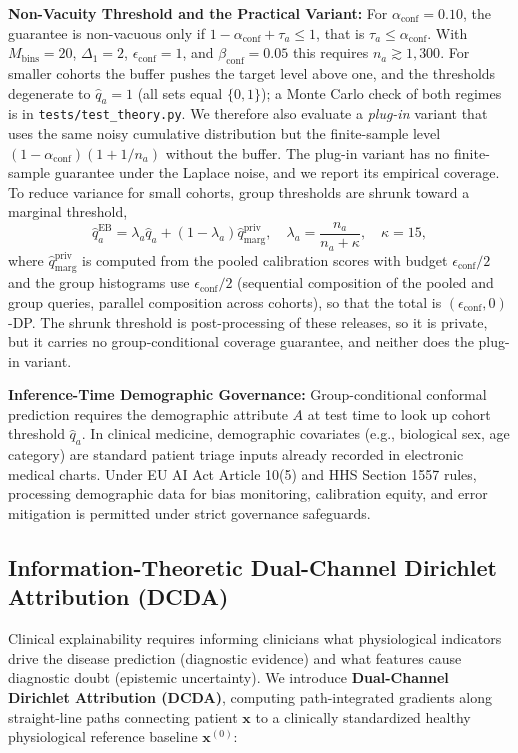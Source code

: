 \documentclass[3p,12pt]{elsarticle}
\theoremstyle{plain}
\theoremstyle{definition}
\begin{document}
\noindent \textbf{Non-Vacuity Threshold and the Practical Variant:} For $\alpha_{\text{conf}} = 0.10$, the guarantee is non-vacuous only if $1 - \alpha_{\text{conf}} + \tau_a \le 1$, that is $\tau_a \le \alpha_{\text{conf}}$. With $M_{\text{bins}} = 20$, $\Delta_1 = 2$, $\epsilon_{\text{conf}} = 1$, and $\beta_{\text{conf}} = 0.05$ this requires $n_a \gtrsim 1{,}300$. For smaller cohorts the buffer pushes the target level above one, and the thresholds degenerate to $\hat{q}_a = 1$ (all sets equal $\{0,1\}$); a Monte Carlo check of both regimes is in \texttt{tests/test\_theory.py}. We therefore also evaluate a \emph{plug-in} variant that uses the same noisy cumulative distribution but the finite-sample level $(1-\alpha_{\text{conf}})(1 + 1/n_a)$ without the buffer. The plug-in variant has no finite-sample guarantee under the Laplace noise, and we report its empirical coverage. To reduce variance for small cohorts, group thresholds are shrunk toward a marginal threshold,
\begin{equation}
    \hat{q}_a^{\text{EB}} = \lambda_a \hat{q}_a + (1 - \lambda_a) \hat{q}_{\text{marg}}^{\text{priv}}, \quad \lambda_a = \frac{n_a}{n_a + \kappa}, \quad \kappa = 15,
\end{equation}
where $\hat{q}_{\text{marg}}^{\text{priv}}$ is computed from the pooled calibration scores with budget $\epsilon_{\text{conf}}/2$ and the group histograms use $\epsilon_{\text{conf}}/2$ (sequential composition of the pooled and group queries, parallel composition across cohorts), so that the total is $(\epsilon_{\text{conf}}, 0)$-DP. The shrunk threshold is post-processing of these releases, so it is private, but it carries no group-conditional coverage guarantee, and neither does the plug-in variant.

\noindent \textbf{Inference-Time Demographic Governance:} Group-conditional conformal prediction requires the demographic attribute $A$ at test time to look up cohort threshold $\hat{q}_a$. In clinical medicine, demographic covariates (e.g., biological sex, age category) are standard patient triage inputs already recorded in electronic medical charts. Under EU AI Act Article 10(5) and HHS Section 1557 rules, processing demographic data for bias monitoring, calibration equity, and error mitigation is permitted under strict governance safeguards.

\subsection{Information-Theoretic Dual-Channel Dirichlet Attribution (DCDA)}
Clinical explainability requires informing clinicians what physiological indicators drive the disease prediction (diagnostic evidence) and what features cause diagnostic doubt (epistemic uncertainty). We introduce \textbf{Dual-Channel Dirichlet Attribution (DCDA)}, computing path-integrated gradients along straight-line paths connecting patient $\mathbf{x}$ to a clinically standardized healthy physiological reference baseline $\mathbf{x}^{(0)}$:
\end{document}
